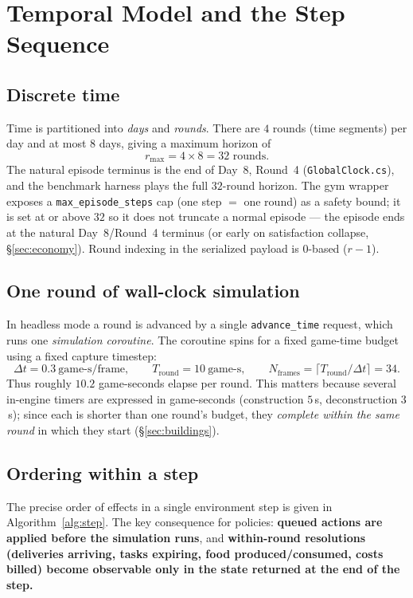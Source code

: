 \documentclass[11pt]{article}
\newcommand{\code}[1]{\texttt{\small #1}}
\newcommand{\file}[1]{\textcolor{blue!40!black}{\texttt{\footnotesize #1}}}
\newcommand{\Round}{r}
\begin{document}
\section{Temporal Model and the Step Sequence}
\label{sec:temporal}

\subsection{Discrete time}
Time is partitioned into \emph{days} and \emph{rounds}. There are $4$ rounds
(time segments) per day and at most $8$ days, giving a maximum horizon of
\[
  \Round_{\max} = 4 \times 8 = 32 \text{ rounds.}
\]
The natural episode terminus is the end of Day~8, Round~4
(\file{GlobalClock.cs}), and the benchmark harness plays the full $32$-round
horizon. The gym wrapper exposes a \code{max\_episode\_steps} cap (one step $=$
one round) as a safety bound; it is set at or above $32$ so it does not truncate
a normal episode --- the episode ends at the natural Day~8/Round~4 terminus (or
early on satisfaction collapse, \S\ref{sec:economy}). Round indexing in
the serialized payload is $0$-based ($\Round\!-\!1$).

\subsection{One round of wall-clock simulation}
In headless mode a round is advanced by a single \code{advance\_time} request,
which runs one \emph{simulation coroutine}. The coroutine spins for a fixed
game-time budget using a fixed capture timestep:
\[
  \Delta t = 0.3\ \text{game-s/frame}, \qquad
  T_{\text{round}} = 10\ \text{game-s}, \qquad
  N_{\text{frames}} = \lceil T_{\text{round}}/\Delta t \rceil = 34 .
\]
Thus roughly $10.2$ game-seconds elapse per round. This matters because several
in-engine timers are expressed in game-seconds (construction $5$\,s,
deconstruction $3$\,s); since each is shorter than one round's budget, they
\emph{complete within the same round} in which they start
(\S\ref{sec:buildings}).

\subsection{Ordering within a step}
The precise order of effects in a single environment step is given in
Algorithm~\ref{alg:step}. The key consequence for policies: \textbf{queued
actions are applied before the simulation runs}, and \textbf{within-round
resolutions (deliveries arriving, tasks expiring, food produced/consumed, costs
billed) become observable only in the state returned at the end of the step.}
\end{document}
